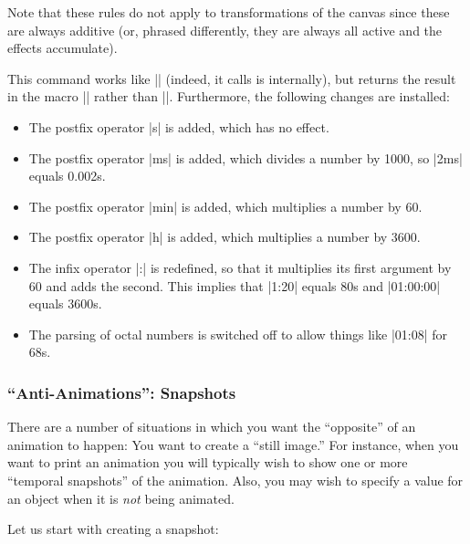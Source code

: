 Note that these rules do not apply to transformations of the canvas since these
are always additive (or, phrased differently, they are always all active and
the effects accumulate).

\begin{command}{\pgfparsetime{}}
    This command works like |\pgfmathparse| (indeed, it calls is internally),
    but returns the result in the macro |\pgftimeresult| rather than
    |\pgfmathresult|. Furthermore, the following changes are installed:
    \begin{itemize}
        \item The postfix operator |s| is added, which has no effect.
        \item The postfix operator |ms| is added, which divides a number by
            1000, so |2ms| equals 0.002s.
        \item The postfix operator |min| is added, which multiplies a number by
            60.
        \item The postfix operator |h| is added, which multiplies a number by
            3600.
        \item The infix operator |:| is redefined, so that it multiplies its
            first argument by 60 and adds the second. This implies that |1:20|
            equals 80s and |01:00:00| equals 3600s.
        \item The parsing of octal numbers is switched off to allow things like
            |01:08| for 68s.
    \end{itemize}
\end{command}


\subsubsection{``Anti-Animations'': Snapshots}

There are a number of situations in which you want the ``opposite'' of an
animation to happen: You want to create a ``still image.'' For instance, when
you want to print an animation you will typically wish to show one or more
``temporal snapshots'' of the animation. Also, you may wish to specify a value
for an object when it is \emph{not} being animated.

Let us start with creating a snapshot:

